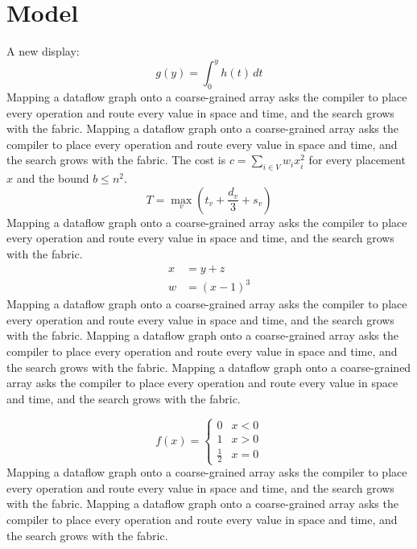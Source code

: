 \documentclass[twocolumn]{article}
\begin{document}
\section{Model}
A new display:
\begin{equation}
  g(y) = \int_0^y h(t)\,dt
\end{equation}
Mapping a dataflow graph onto a coarse-grained array asks the compiler to place every operation and route every value in space and time, and the search grows with the fabric. Mapping a dataflow graph onto a coarse-grained array asks the compiler to place every operation and route every value in space and time, and the search grows with the fabric. The cost is $c = \sum_{i \in V} w_i x_i^2$ for every placement $x$ and the bound $b \le n^2$.
\begin{equation}\label{eq:a}
  T = \max_{v} \left( t_v + \frac{d_v}{3} + s_v \right)
\end{equation}
Mapping a dataflow graph onto a coarse-grained array asks the compiler to place every operation and route every value in space and time, and the search grows with the fabric.
\begin{align}
  x &= y + z \label{eq:b}\\
  w &= \left( x - 1 \right)^3 \nonumber
\end{align}
Mapping a dataflow graph onto a coarse-grained array asks the compiler to place every operation and route every value in space and time, and the search grows with the fabric.
Mapping a dataflow graph onto a coarse-grained array asks the compiler to place every operation and route every value in space and time, and the search grows with the fabric. Mapping a dataflow graph onto a coarse-grained array asks the compiler to place every operation and route every value in space and time, and the search grows with the fabric.

\begin{equation*}
  f(x) = \begin{cases} 0 & x < 0 \\ 1 & x > 0 \\ \tfrac12 & x = 0 \end{cases}
\end{equation*}
Mapping a dataflow graph onto a coarse-grained array asks the compiler to place every operation and route every value in space and time, and the search grows with the fabric. Mapping a dataflow graph onto a coarse-grained array asks the compiler to place every operation and route every value in space and time, and the search grows with the fabric.
\end{document}
